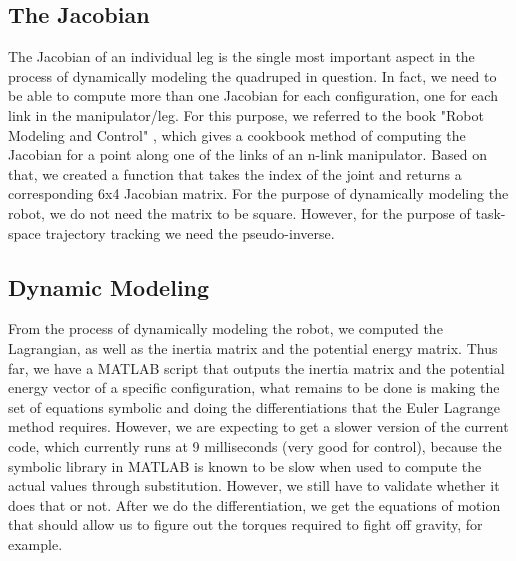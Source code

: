 \documentclass[letterpaper, 10 pt, conference]{ieeeconf}  %
\begin{document}
\subsection{The Jacobian}
The Jacobian of an individual leg is the single most important aspect in the process of dynamically modeling the quadruped in question. In fact, we need to be able to compute more than one Jacobian for each configuration, one for each link in the manipulator/leg.
For this purpose, we referred to the book "Robot Modeling and Control" \cite{spong2006robot}, which gives a cookbook method of computing the Jacobian for a point along one of the links of an n-link manipulator. Based on that, we created a function that takes the index of the joint and returns a corresponding 6x4 Jacobian matrix. For the purpose of dynamically modeling the robot, we do not need the matrix to be square. However, for the purpose of task-space trajectory tracking we need the pseudo-inverse.

\subsection{Dynamic Modeling}
From the process of dynamically modeling the robot, we computed the Lagrangian, as well as the inertia matrix and the potential energy matrix.
Thus far, we have a MATLAB script that outputs the inertia matrix and the potential energy vector of a specific configuration, what remains to be done is making the set of equations symbolic and doing the differentiations that the Euler Lagrange method requires.
However, we are expecting to get a slower version of the current code, which currently runs at 9 milliseconds (very good for control), because the symbolic library in MATLAB is known to be slow when used to compute the actual values through substitution. However, we still have to validate whether it does that or not.
After we do the differentiation, we get the equations of motion that should allow us to figure out the torques required to fight off gravity, for example.
\end{document}
